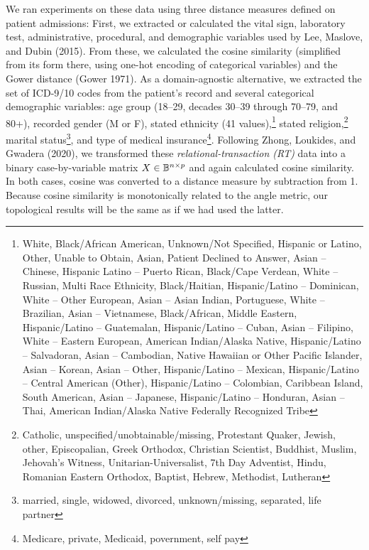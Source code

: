 \documentclass{article}
\begin{document}
We ran experiments on these data using three distance measures defined
on patient admissions: First, we extracted or calculated the vital sign,
laboratory test, administrative, procedural, and demographic variables
used by Lee, Maslove, and Dubin (2015). From these, we calculated the
cosine similarity (simplified from its form there, using one-hot
encoding of categorical variables) and the Gower distance (Gower 1971).
As a domain-agnostic alternative, we extracted the set of ICD-9/10 codes
from the patient's record and several categorical demographic variables:
age group (18--29, decades 30--39 through 70--79, and 80+), recorded
gender (M or F), stated ethnicity (41 values),\footnote{White,
  Black/African American, Unknown/Not Specified, Hispanic or Latino,
  Other, Unable to Obtain, Asian, Patient Declined to Answer, Asian --
  Chinese, Hispanic Latino -- Puerto Rican, Black/Cape Verdean, White --
  Russian, Multi Race Ethnicity, Black/Haitian, Hispanic/Latino --
  Dominican, White -- Other European, Asian -- Asian Indian, Portuguese,
  White -- Brazilian, Asian -- Vietnamese, Black/African, Middle
  Eastern, Hispanic/Latino -- Guatemalan, Hispanic/Latino -- Cuban,
  Asian -- Filipino, White -- Eastern European, American Indian/Alaska
  Native, Hispanic/Latino -- Salvadoran, Asian -- Cambodian, Native
  Hawaiian or Other Pacific Islander, Asian -- Korean, Asian -- Other,
  Hispanic/Latino -- Mexican, Hispanic/Latino -- Central American
  (Other), Hispanic/Latino -- Colombian, Caribbean Island, South
  American, Asian -- Japanese, Hispanic/Latino -- Honduran, Asian --
  Thai, American Indian/Alaska Native Federally Recognized Tribe} stated
religion,\footnote{Catholic, unspecified/unobtainable/missing,
  Protestant Quaker, Jewish, other, Episcopalian, Greek Orthodox,
  Christian Scientist, Buddhist, Muslim, Jehovah's Witness,
  Unitarian-Universalist, 7th Day Adventist, Hindu, Romanian Eastern
  Orthodox, Baptist, Hebrew, Methodist, Lutheran} marital
status\footnote{married, single, widowed, divorced, unknown/missing,
  separated, life partner}, and type of medical insurance\footnote{Medicare,
  private, Medicaid, povernment, self pay}. Following Zhong, Loukides,
and Gwadera (2020), we transformed these \emph{relational-transaction
(RT)} data into a binary case-by-variable matrix
\(X \in \mathbb{B}^{n \times p}\) and again calculated cosine similarity. In
both cases, cosine was converted to a distance measure by subtraction
from 1. Because cosine similarity is monotonically related to the angle
metric, our topological results will be the same as if we had used the
latter.
\end{document}
